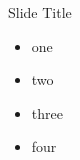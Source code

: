 \begin{frame}{Slide Title}

\begin{itemize}
    \item one
    \item two
    \item three
    \item four
\end{itemize}
\end{frame}

